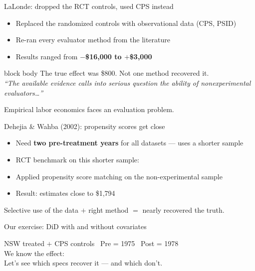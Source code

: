 \documentclass[aspectratio=169,11pt]{beamer}
\newcommand{\emphbox}[1]{%
  \begin{beamercolorbox}[rounded=true,sep=7pt,wd=\linewidth]{block body}%
    \small\color{slate} #1%
  \end{beamercolorbox}}
\begin{document}
\begin{frame}{LaLonde: dropped the RCT controls, used CPS instead}
\vspace{0.6em}
\begin{itemize}\setlength\itemsep{0.55em}
  \item Replaced the randomized controls with observational data (CPS, PSID)
  \item Re-ran every evaluator method from the literature
  \item Results ranged from \textbf{$-$\$16,000 to $+$\$3,000}
\end{itemize}
\vspace{0.5em}
\emphbox{The true effect was \$800. Not one method recovered it. \\
\textit{``The available evidence calls into serious question the ability of nonexperimental evaluators\ldots''}}
\vspace{0.3em}
\begin{center}\color{warmgray}\small
Empirical labor economics faces an evaluation problem.
\end{center}
\end{frame}

\begin{frame}{Dehejia \& Wahba (2002): propensity scores get close}
\vspace{0.6em}
\begin{itemize}\setlength\itemsep{0.55em}
  \item Need \textbf{two pre-treatment years} for all datasets --- uses a shorter sample
  \item RCT benchmark on this shorter sample: 
  \item Applied propensity score matching on the non-experimental sample
  \item Result: estimates close to \$1,794
\end{itemize}
\vspace{0.5em}
\begin{center}\color{warmgray}\small
Selective use of the data $+$ right method $=$ nearly recovered the truth.
\end{center}
\end{frame}

\begin{frame}{Our exercise: DiD with and without covariates}
\vspace{0.8em}
\begin{center}
NSW treated $+$ CPS controls \textperiodcentered\
Pre = 1975 \textperiodcentered\ Post = 1978\\[0.6em]
\large We know the effect: \\[0.6em]
\normalsize\color{warmgray}
Let's see which specs recover it --- and which don't.
\end{center}
\end{frame}
\end{document}
